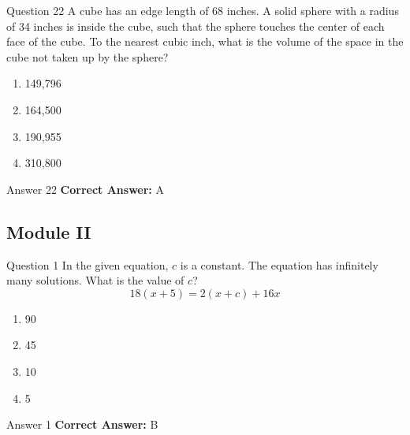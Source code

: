 \documentclass{beamer}
\begin{document}
\begin{frame}{Question 22}
\small
A cube has an edge length of 68 inches. A solid sphere with a radius of 34 inches is inside the cube, such that the sphere touches the center of each face of the cube. To the nearest cubic inch, what is the volume of the space in the cube not taken up by the sphere?
\vspace{0.35cm}
\begin{enumerate}
    \item[A.] 149,796
    \item[B.] 164,500
    \item[C.] 190,955
    \item[D.] 310,800
\end{enumerate}

\end{frame}
\begin{frame}{Answer 22}
\small
\textbf{Correct Answer:} A
\end{frame}

\begin{frame}
\section{Module II}
\end{frame}

\begin{frame}{Question 1}
\small
In the given equation, \(c\) is a constant. The equation has infinitely many solutions. What is the value of \(c\)?
\[
18(x+5)=2(x+c)+16x
\]
\vspace{0.35cm}
\begin{enumerate}
    \item[A.] 90
    \item[B.] 45
    \item[C.] 10
    \item[D.] 5
\end{enumerate}
\end{frame}
\begin{frame}{Answer 1}
\small
\textbf{Correct Answer:} B
\end{frame}
\end{document}

